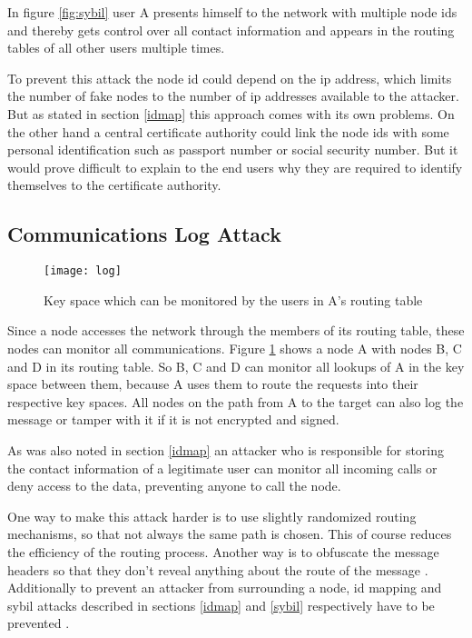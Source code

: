 \documentclass[a4paper,conference]{IEEEtran}
\begin{document}
In figure \ref{fig:sybil} user A presents himself to the network with multiple
node ids and thereby gets control over all contact information and appears in
the routing tables of all other users multiple times.

To prevent this attack the node id could depend on the ip address, which limits
the number of fake nodes to the number of ip addresses available to the
attacker. But
as stated in section \ref{idmap} this approach comes with its own problems. On
the other hand a central certificate authority could link the
node ids with some personal identification such as passport number or social
security number. But it would prove difficult to explain to the end users
why they are required to identify themselves to the certificate authority.

\subsection{Communications Log Attack}
\label{comlog}
\begin{figure}
\centering
\texttt{[image: log]}

\caption{Key space which can be monitored by the users in A's routing table
\cite{touceda}}
\label{fig:log}
\end{figure}
Since a node accesses the network through the members of its routing table,
these nodes can monitor all communications. Figure \ref{fig:log} shows a node A
with
nodes B, C and D in its routing table. So
B, C and D can monitor all lookups of A in the key space between them, because A
uses them to route the requests into their respective key spaces. All
nodes on the path from A to the target can also log the message or tamper with
it if it is not encrypted and signed.

As was also noted in section \ref{idmap} an attacker who is responsible for
storing the contact information of a legitimate user can monitor all
incoming calls or deny access to the data, preventing anyone to call the node.

One way to make this attack harder is to use slightly randomized routing
mechanisms, so that not always the same path is chosen. This of course
reduces the efficiency of the routing process. Another way is to obfuscate the
message headers so that they don't reveal anything about the route of
the message \cite{touceda}.
Additionally to prevent an attacker from surrounding a node, id mapping and
sybil attacks described in sections \ref{idmap} and \ref{sybil} respectively
have
to be prevented \cite{touceda}.
\end{document}
